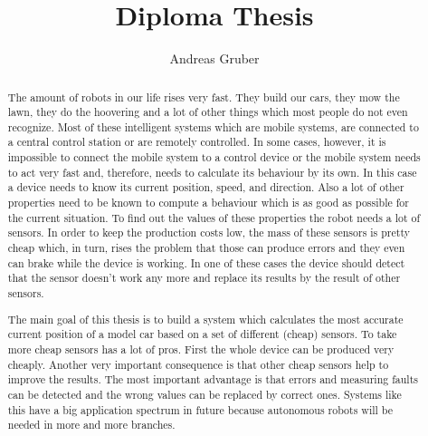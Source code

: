 \documentclass[english, 10pt]{report}
\begin{document}
\title{Diploma Thesis}


\author{Andreas Gruber}
\maketitle
\begin{abstract}
The amount of robots in our life rises very fast. They build our cars,
they mow the lawn, they do the hoovering and a lot of other things
which most people do not even recognize. Most of these intelligent
systems which are mobile systems, are connected to a central control
station or are remotely controlled. In some cases, however, it is
impossible to connect the mobile system to a control device or the
mobile system needs to act very fast and, therefore, needs to calculate
its behaviour by its own. In this case a device needs to know  its
current position, speed, and direction. Also a lot of other properties
need to be known to compute a behaviour which is as good as possible
for the current situation. To find out the values of these properties
the robot needs a lot of sensors. In order to keep the production
costs low, the mass of these sensors is pretty cheap which, in turn,
rises the problem that those can produce errors and they even can
brake while the device is working. In one of these cases the device
should detect that the sensor doesn't work any more and replace its
results by the result of other sensors.

The main goal of this thesis is to build a system which calculates the
most accurate current position of a model car based on a set of different
(cheap) sensors. To take more cheap sensors
has a lot of pros. First the whole device can be produced very cheaply.
Another very important consequence is that other cheap sensors help
to improve the results. The most important advantage is that %
errors and measuring faults can be detected and the wrong values can
be replaced by correct ones. Systems like this have a big application
spectrum in future because autonomous robots will be needed in more
and more branches.
\end{abstract}

\end{document}
